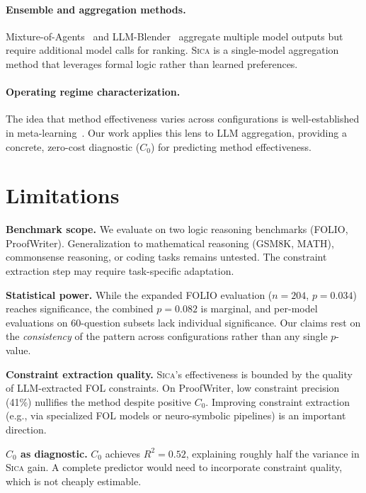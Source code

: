 \documentclass[11pt,a4paper]{article}
\newcommand{\sica}{\textsc{Sica}}
\begin{document}
\paragraph{Ensemble and aggregation methods.}
Mixture-of-Agents~\citep{wang2024mixture} and LLM-Blender~\citep{jiang2023llmblender} aggregate multiple model outputs but require additional model calls for ranking.
\sica{} is a single-model aggregation method that leverages formal logic rather than learned preferences.

\paragraph{Operating regime characterization.}
The idea that method effectiveness varies across configurations is well-established in meta-learning~\citep{rice1976algorithm}.
Our work applies this lens to LLM aggregation, providing a concrete, zero-cost diagnostic ($C_0$) for predicting method effectiveness.

\section{Limitations}
\label{sec:limitations}

\textbf{Benchmark scope.}
We evaluate on two logic reasoning benchmarks (FOLIO, ProofWriter).
Generalization to mathematical reasoning (GSM8K, MATH), commonsense reasoning, or coding tasks remains untested.
The constraint extraction step may require task-specific adaptation.

\textbf{Statistical power.}
While the expanded FOLIO evaluation ($n{=}204$, $p{=}0.034$) reaches significance, the combined $p{=}0.082$ is marginal, and per-model evaluations on 60-question subsets lack individual significance.
Our claims rest on the \emph{consistency} of the pattern across configurations rather than any single $p$-value.

\textbf{Constraint extraction quality.}
\sica{}'s effectiveness is bounded by the quality of LLM-extracted FOL constraints.
On ProofWriter, low constraint precision (41\%) nullifies the method despite positive $C_0$.
Improving constraint extraction (e.g., via specialized FOL models or neuro-symbolic pipelines) is an important direction.

\textbf{$C_0$ as diagnostic.}
$C_0$ achieves $R^2 = 0.52$, explaining roughly half the variance in \sica{} gain.
A complete predictor would need to incorporate constraint quality, which is not cheaply estimable.
\end{document}
